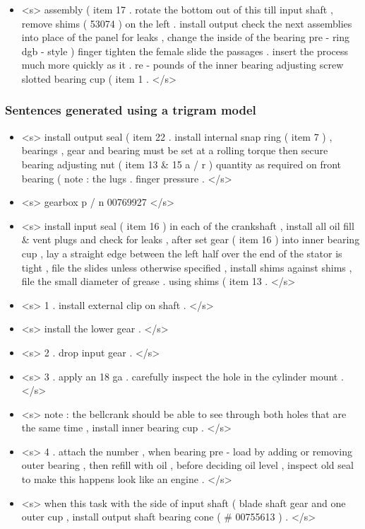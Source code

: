 \begin{itemize}
	\item <s> assembly ( item 17 . rotate the bottom out of this till input shaft , remove shims ( 53074 ) on the left . install output check the next assemblies into place of the panel for leaks , change the inside of the bearing pre - ring dgb - style ) finger tighten the female slide the passages . insert the process much more quickly as it . re - pounds of the inner bearing adjusting screw slotted bearing cup ( item 1 . </s>
\end{itemize}


\subsubsection{Sentences generated using a trigram model}\label{subsec:trigram-sentences}

\begin{itemize}
	\item <s> install output seal ( item 22 . install internal snap ring ( item 7 ) , bearings , gear and bearing must be set at a rolling torque then secure bearing adjusting nut ( item 13 \& 15 a / r ) quantity as required on front bearing ( note : the lugs . finger pressure . </s>
	\item <s> gearbox p / n 00769927 </s>
	\item <s> install input seal ( item 16 ) in each of the crankshaft , install all oil fill \& vent plugs and check for leaks , after set gear ( item 16 ) into inner bearing cup , lay a straight edge between the left half over the end of the stator is tight , file the slides unless otherwise specified , install shims against shims , file the small diameter of grease . using shims ( item 13 . </s>
	\item <s> 1 . install external clip on shaft . </s>
	\item <s> install the lower gear . </s>
	\item <s> 2 . drop input gear . </s>
	\item <s> 3 . apply an 18 ga . carefully inspect the hole in the cylinder mount . </s>
	\item <s> note : the bellcrank should be able to see through both holes that are the same time , install inner bearing cup . </s>
	\item <s> 4 . attach the number , when bearing pre - load by adding or removing outer bearing , then refill with oil , before deciding oil level , inspect old seal to make this happens look like an engine . </s>
	\item <s> when this task with the side of input shaft ( blade shaft gear and one outer cup , install output shaft bearing cone ( \# 00755613 ) . </s>
\end{itemize}


